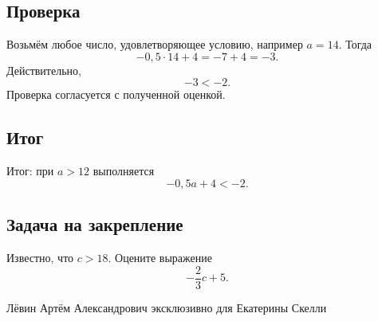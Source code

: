 \documentclass[12pt,a4paper]{article}
\newcommand{\resultlabel}{\textcolor{teal!60!black}{Итог:}}
\begin{document}
\subsection*{Проверка}
Возьмём любое число, удовлетворяющее условию, например $a=14$. Тогда
\[
-0{,}5\cdot 14+4=-7+4=-3.
\]
Действительно,
\[
-3<-2.
\]
Проверка согласуется с полученной оценкой.

\subsection*{Итог}
\resultlabel{} при $a>12$ выполняется
\[
\boxed{-0{,}5a+4<-2}.
\]

\subsection*{Задача на закрепление}
Известно, что $c>18$. Оцените выражение
\[
-\frac{2}{3}c+5.
\]

\vfill
\begin{center}
\small Лёвин Артём Александрович эксклюзивно для Екатерины Скелли
\end{center}
\end{document}
